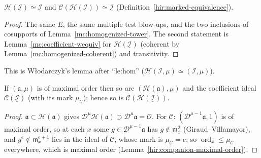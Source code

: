 \begin{lemma}
\label{mc:homogenized-equivalent}
\leanok
\(\mathcal H(\underline{\mathcal I})\simeq\underline{\mathcal I}\) and \(\mathcal C(\mathcal H(\underline{\mathcal I}))\simeq\underline{\mathcal I}\) (Definition~\ref{hir:marked-equivalence}).
\end{lemma}
\begin{proof}
\leanok
The same \(E\), the same multiple test blow-ups, and the two inclusions of cosupports of Lemma~\ref{mc:homogenized-tower}. The second statement is
Lemma~\ref{mc:coefficient-wequiv} for \(\mathcal H(\underline{\mathcal I})\) (coherent by Lemma~\ref{mc:homogenized-coherent}) and transitivity.
\end{proof}
This is Włodarczyk's lemma after ``le:hom'' (\(\mathcal H(\mathcal I,\mu)\simeq(\mathcal I,\mu)\)).

\begin{lemma}
\label{mc:homogenized-maximal-order}
\leanok
If \((\mathfrak a,\mu)\) is of maximal order then so are \((\mathcal H(\mathfrak a),\mu)\) and the coefficient ideal \(\mathcal C(\underline{\mathcal I})\) (with its mark
\(\mu_{\mathcal C}\)); hence so is \(\mathcal C(\mathcal H(\underline{\mathcal I}))\).
\end{lemma}
\begin{proof}
\leanok
\(\mathfrak a\subset\mathcal H(\mathfrak a)\) gives \(\mathcal D^\mu\mathcal H(\mathfrak a)\supset\mathcal D^\mu\mathfrak a=\mathcal O\). For \(\mathcal C\): \((\mathcal D^{\mu-1}\mathfrak a,1)\)
is of maximal order, so at each \(x\) some \(g\in\mathcal D^{\mu-1}\mathfrak a\) has \(g\notin\mathfrak m_x^2\) (Giraud--Villamayor), and \(g^e\notin\mathfrak m_x^{e+1}\)
lies in the ideal of \(\mathcal C\), whose mark is \(\mu_{\mathcal C}=e\); so \(\operatorname{ord}_x\le\mu_{\mathcal C}\) everywhere, which is maximal order
(Lemma~\ref{hir:companion-maximal-order}).
\end{proof}

